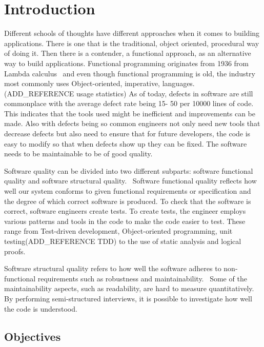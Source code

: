 \chapter{Introduction}\label{introduction}

Different schools of thoughts have different approaches when it comes to
building applications. There is one that is the traditional, object oriented,
procedural way of doing it. Then there is a contender, a functional approach, as
an alternative way to build applications. Functional programming originates from
1936 from Lambda calculus~\cite{Turner} and even though functional programming
is old, the industry most commonly uses Object-oriented, imperative, languages.
(ADD\_REFERENCE usage statistics) As of today, defects in software are still
commonplace with the average defect rate being 15- 50 per 10000 lines of
code.~\cite{McConnell:2004:CCS:1096143} This indicates that the tools used might
be inefficient and improvements can be made. Also with defects being so common
engineers not only need new tools that decrease defects but also need to ensure
that for future developers, the code is easy to modify so that when defects show
up they can be fixed. The software needs to be maintainable to be of good
quality.

Software quality can be divided into two different subparts: software functional
quality and software structural quality.~\cite{Pressman:2004:SEP:994110}
Software functional quality reflects how well our system conforms to given
functional requirements or specification and the degree of which correct
software is produced.  To check that the software is correct, software engineers
create tests. To create tests, the engineer employs various patterns
and tools in the code to make the code easier to test. These range from
Test-driven development, Object-oriented programming, unit
testing(ADD\_REFERENCE TDD) to the use of static analysis and logical
proofs. 

Software structural quality refers to how well the software adheres to
non-functional requirements such as robustness and
maintainability.~\cite{Pressman:2004:SEP:994110} Some of the maintainability
aspects, such as readability, are hard to measure quantitatively. By performing
semi-structured interviews, it is possible to investigate how well the code is
understood. 

\section{Objectives}

